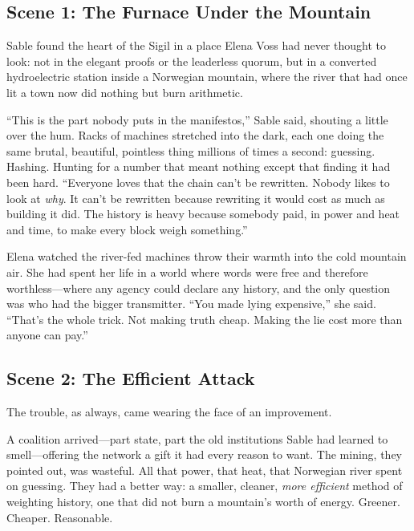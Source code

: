 \documentclass[12pt,letterpaper]{book}
\begin{document}
\hypertarget{scene-1-the-furnace-under-the-mountain}{%
\subsection{Scene 1: The Furnace Under the
Mountain}\label{scene-1-the-furnace-under-the-mountain}}

Sable found the heart of the Sigil in a place Elena Voss had never thought to
look: not in the elegant proofs or the leaderless quorum, but in a converted
hydroelectric station inside a Norwegian mountain, where the river that had once
lit a town now did nothing but burn arithmetic.

``This is the part nobody puts in the manifestos,'' Sable said, shouting a little
over the hum. Racks of machines stretched into the dark, each one doing the same
brutal, beautiful, pointless thing millions of times a second: guessing. Hashing.
Hunting for a number that meant nothing except that finding it had been hard.
``Everyone loves that the chain can't be rewritten. Nobody likes to look at
\emph{why}. It can't be rewritten because rewriting it would cost as much as
building it did. The history is heavy because somebody paid, in power and heat and
time, to make every block weigh something.''

Elena watched the river-fed machines throw their warmth into the cold mountain
air. She had spent her life in a world where words were free and therefore
worthless---where any agency could declare any history, and the only question was
who had the bigger transmitter. ``You made lying expensive,'' she said. ``That's
the whole trick. Not making truth cheap. Making the lie cost more than anyone can
pay.''

\hypertarget{scene-2-the-efficient-attack}{%
\subsection{Scene 2: The Efficient
Attack}\label{scene-2-the-efficient-attack}}

The trouble, as always, came wearing the face of an improvement.

A coalition arrived---part state, part the old institutions Sable had learned to
smell---offering the network a gift it had every reason to want. The mining, they
pointed out, was wasteful. All that power, that heat, that Norwegian river spent on
guessing. They had a better way: a smaller, cleaner, \emph{more efficient} method
of weighting history, one that did not burn a mountain's worth of energy. Greener.
Cheaper. Reasonable.
\end{document}
